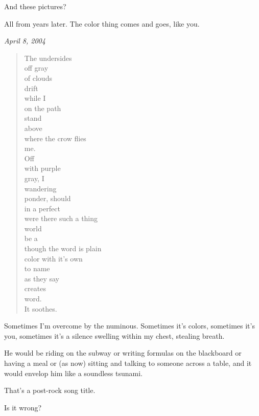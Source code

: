 \begin{paracol}{2}
\begin{leftcolumn}
\begin{ally}
And these pictures?
\end{ally}
All from years later. The color thing comes and goes, like you.
\end{leftcolumn}
\begin{rightcolumn*}
\begin{flushright}
\emph{April 8, 2004}
\end{flushright}
\end{rightcolumn*}
\begin{leftcolumn}
\begin{verse}
The undersides\\
\vin \vin off gray\\
\vin of clouds\\
\vin drift\\
\vin \vin while I\\
\vin \vin \vin on the path\\
\vin \vin stand\\
\vin above\\
\vin \vin where the crow flies\\
\vin me.\\
Off\\
\vin \vin with purple\\
\vin gray, I\\
\vin \vin wandering\\
\vin ponder, should\\
\vin \vin in a perfect\\
\vin \vin \vin were there such a thing\\
\vin \vin world\\
\vin be a\\
\vin \vin though the word is plain\\
\vin color with it's own\\
\vin \vin to name\\
\vin \vin \vin as they say\\
\vin \vin creates\\
\vin word.\\
It soothes.
\end{verse}

Sometimes I'm overcome by the numinous. Sometimes it's colors, sometimes it's you, sometimes it's a silence swelling within my chest, stealing breath.

\begin{ally}
He would be riding on the subway or writing formulas on the blackboard or having a meal or (as now) sitting and talking to someone across a table, and it would envelop him like a soundless tsunami.
\end{ally}
That's a post-rock song title.

\begin{ally}
Is it wrong?
\end{ally}
\end{leftcolumn}
\end{paracol}

